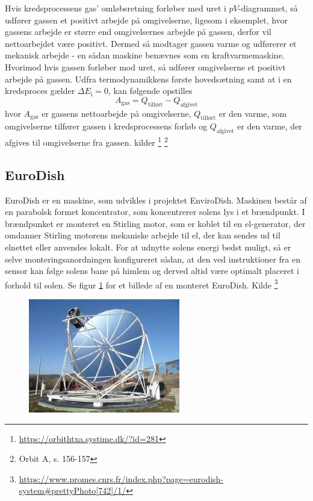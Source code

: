 \documentclass[SRC.tex]{subfiles}
\begin{document}
	Hvis kredsprocessens gas' omløbsretning forløber med uret i \(pV\)-diagrammet, 
	så udfører gassen et positivt arbejde på omgivelserne, ligesom i eksemplet, 
	hvor gassens arbejde er større end omgivelsernes arbejde på gassen, derfor vil 
	nettoarbejdet være positivt. Dermed så modtager gassen varme og 
	udførerer et mekanisk arbejde - en sådan maskine benævnes som en kraftvarmemaskine. Hvorimod hvis gassen forløber mod uret, så udfører 
	omgivelserne et positivt arbejde på gassen. Udfra termodynamikkens første 
	hovedsætning samt at i en kredsproces gælder \(\Delta E_\text{i} = 0\), kan 
	følgende opstilles
	\begin{equation}
	A_{\text{gas}} = Q_{\text{tilført}} - Q_{\text{afgivet}}
	\end{equation} 
	hvor \(A_{\text{gas}}\) er gassens nettoarbejde på omgivelserne, 
	\(Q_{\text{tilført}}\) er den varme, som omgivelserne tilfører gassen i 
	kredsprocessens forløb og \(Q_{\text{afgivet}}\) er den varme, der afgives 
	til omgivelserne fra gassen. kilder \footnote{\url{https://orbithtxa.systime.dk/?id=281}}
	\footnote{Orbit A, s. 156-157}
	
	\subsection{EuroDish}
	EuroDish er en maskine, som udvikles i projektet EnviroDish. Maskinen består
	af en parabolsk formet koncentrator, som koncentrerer solens lys i et brændpunkt. 
	I brændpunket er monteret en Stirling motor, som er koblet til en el-generator,
	der omdanner Stirling motorens mekaniske arbejde til el, der kan sendes ud til 
	elnettet eller anvendes lokalt. For at udnytte solens energi bedst muligt, så er
	selve monteringsanordningen konfigureret sådan, at den ved instruktioner fra en 
	sensor kan følge solens bane på himlem og derved altid være optimalt placeret i forhold til solen. Se figur \ref{fig:744-9} for et billede af en 
	monteret EuroDish. Kilde \footnote{\url{https://www.promes.cnrs.fr/index.php?page=eurodish-system#prettyPhoto[742]/1/}}
	\begin{figure}[h]
		\centering
		\includegraphics[scale=0.6]{Billeder/744-9}
		\caption{}
		\label{fig:744-9}
	\end{figure}
\end{document}
